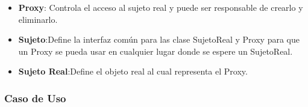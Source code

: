 \begin{itemize}
	\item \textbf{Proxy}: Controla el acceso al sujeto real y puede ser responsable de crearlo y eliminarlo.
	\item \textbf{Sujeto}:Define la interfaz común para las clase SujetoReal y Proxy para que un Proxy se pueda usar en cualquier lugar donde se espere un SujetoReal.
	\item \textbf{Sujeto Real}:Define el objeto real al cual representa el Proxy.
\end{itemize}


\subsubsection{Caso de Uso}


